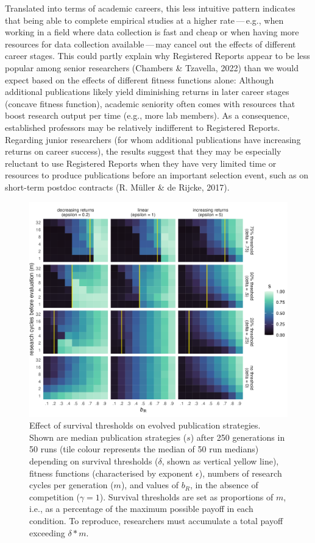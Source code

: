 \documentclass[
  ,man,mask,floatsintext]{apa6}
\begin{document}
Translated into terms of academic careers, this less intuitive pattern indicates that
being able to complete empirical studies at a higher rate\(\,\)---\(\,\)e.g., when working in a field where data collection is fast and cheap or when having more resources for data collection available\(\,\)---\(\,\)may cancel out the effects of different career stages.
This could partly explain why Registered Reports appear to be less popular among senior researchers (Chambers \& Tzavella, 2022) than we would expect based on the effects of different fitness functions alone:
Although additional publications likely yield diminishing returns in later career stages (concave fitness function), academic seniority often comes with resources that boost research output per time (e.g., more lab members).
As a consequence, established professors may be relatively indifferent to Registered Reports.
Regarding junior researchers (for whom additional publications have increasing returns on career success), the results suggest that they may be especially reluctant to use Registered Reports when they have very limited time or resources to produce publications before an important selection event, such as on short-term postdoc contracts (R. Müller \& de Rijcke, 2017).



\begin{figure}
\includegraphics[width=1\linewidth]{plots/plot_delta_tile_evo} \caption{Effect of survival thresholds on evolved publication strategies. Shown are median publication strategies (\(s\)) after 250 generations in 50 runs (tile colour represents the median of 50 run medians) depending on survival thresholds (\(\delta\), shown as vertical yellow line), fitness functions (characterised by exponent \(\epsilon\)), numbers of research cycles per generation (\(m\)), and values of \(b_{R}\), in the absence of competition (\(\gamma = 1\)). Survival thresholds are set as proportions of \(m\), i.e., as a percentage of the maximum possible payoff in each condition. To reproduce, researchers must accumulate a total payoff exceeding \(\delta * m\).}\label{fig:deltaplot}
\end{figure}
\end{document}

